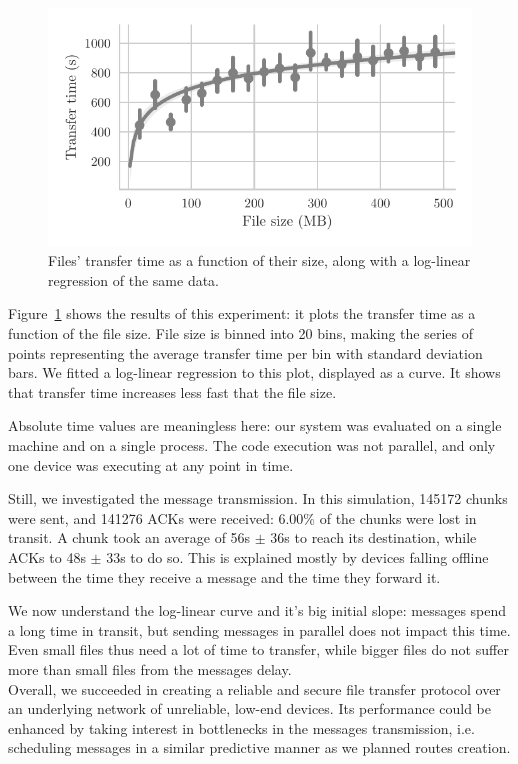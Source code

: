 \begin{figure}[t]
\centering
\includegraphics[width=0.7\columnwidth]{figures/transfer_time_vs_size.pdf}

\caption{\label{fig:transfer_time_vs_size}Files' transfer time as a function of their size, along with a log-linear regression of the same data.}
\end{figure}

Figure~\ref{fig:transfer_time_vs_size} shows the results of this experiment: it plots the transfer time as a function of the file size. File size is binned into 20 bins, making the series of points representing the average transfer time per bin with standard deviation bars.
We fitted a log-linear regression to this plot, displayed as a curve.
It shows that transfer time increases less fast that the file size.

Absolute time values are meaningless here: our system was evaluated on a single machine and on a single process. The code execution was not parallel, and only one device was executing at any point in time.

Still, we investigated the message transmission. In this simulation, 145172 chunks were sent, and 141276 ACKs were received: 6.00\% of the chunks were lost in transit. A chunk took an average of 56s $\pm$ 36s to reach its destination, while ACKs to 48s $\pm$ 33s to do so. This is explained mostly by devices falling offline between the time they receive a message and the time they forward it.

We now understand the log-linear curve and it's big initial slope: messages spend a long time in transit, but sending messages in parallel does not impact this time. Even small files thus need a lot of time to transfer, while bigger files do not suffer more than small files from the messages delay.
\\

Overall, we succeeded in creating a reliable and secure file transfer protocol over an underlying network of unreliable, low-end devices.
Its performance could be enhanced by taking interest in bottlenecks in the messages transmission, i.e. scheduling messages in a similar predictive manner as we planned routes creation.





